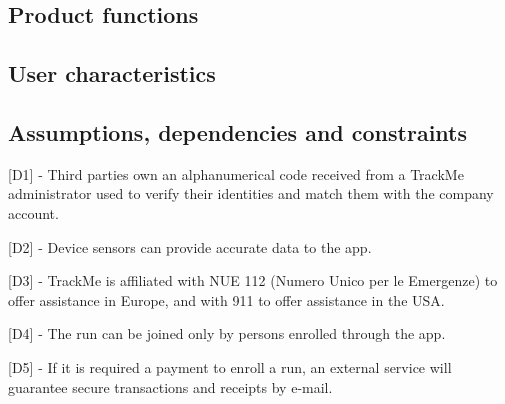 \subsection{Product functions}
\subsection{User characteristics}
\subsection{Assumptions, dependencies and constraints}
\hspace{-\parindent}[D1] - Third parties own an alphanumerical code received from a TrackMe administrator used to verify their identities and match them with the company account. \newline

\hspace{-\parindent}[D2] - Device sensors can provide accurate data to the app. \newline

\hspace{-\parindent}[D3] - TrackMe is affiliated with NUE 112 (Numero Unico per le Emergenze) to offer assistance in Europe, and with 911 to offer assistance in the USA. \newline

\hspace{-\parindent}[D4] - The run can be joined only by persons enrolled through the app. \newline

\hspace{-\parindent}[D5] - If it is required a payment to enroll a run, an external service will guarantee secure transactions and receipts by e-mail. \newline

%